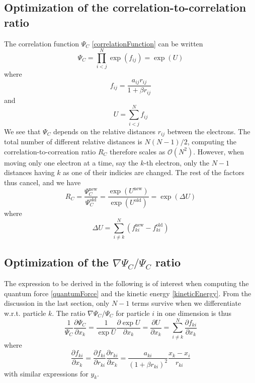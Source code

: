\documentclass[english, a4paper]{article}
\begin{document}
\subsection{Optimization of the correlation-to-correlation ratio} \label{sec:correlationRatio}
The correlation function $\Psi_C$ \eqref{correlationFunction} can be written
\begin{equation}
 \Psi_C = \prod_{i<j}^N\exp{(f_{ij})} = \exp(U)
\end{equation}
where 
\begin{equation}
 f_{ij} = \frac{a_{ij}r_{ij}}{1+\beta r_{ij}}
 \label{pade-jastrow}
\end{equation}
and 
\begin{equation}
 U = \sum_{i<j}^Nf_{ij}
\end{equation}
We see that $\Psi_C$ depends on the relative distances $r_{ij}$ between the electrons. The total
number of different relative distances is $N(N-1)/2$, computing the correlation-to-correation ratio
$R_C$ therefore scales as $\mathcal{O}(N^2)$. However, when moving only one electron at a time, say the 
$k$-th electron, only the $N-1$ distances having $k$ as one of their indicies are changed. The 
rest of the factors thus cancel, and we have
\begin{equation}
 R_C = \frac{\Psi_C^{\textrm{new}}}{\Psi_C^{\textrm{old}}} = 
 \frac{\exp{(U^{\textrm{new}})}}{\exp{(U^{\textrm{old}})}} = 
 \exp{(\Delta U)}
\end{equation}
where 
\begin{equation}
 \Delta U = \sum_{i\neq k}^N (f_{ki}^{\textrm{new}} - f_{ki}^{\textrm{old}})
\end{equation}

\subsection{Optimization of the $\nabla \Psi_C / \Psi_C$ ratio} \label{sec:correlationGradient}
The expression to be derived in the following is of interest when computing the quantum force \eqref{quantumForce}
and the kinetic energy \eqref{kineticEnergy}. From the discussion in the last section, only $N-1$ terms survive
when we differentiate w.r.t. particle $k$. 
The ratio $\nabla \Psi_C / \Psi_C$ for particle $i$
in one dimension is thus
\begin{equation}
\frac{1}{\Psi_C}\frac{\partial \Psi_C}{\partial x_k} = 
\frac{1}{\exp{U}}\frac{\partial \exp{U}}{\partial x_k} = 
\frac{\partial U}{\partial x_k} = 
\sum_{i\neq k}^N \frac{\partial f_{ki}}{\partial x_k}
\end{equation}
where
\begin{equation}
 \frac{\partial f_{ki}}{\partial x_k} = \frac{\partial f_{ki}}{\partial r_{ki}}
 \frac{\partial r_{ki}}{\partial x_k} = \frac{a_{ki}}{(1 + \beta r_{ki})^2}\frac{x_k - x_i}{r_{ki}}
\end{equation}
with similar expressions for $y_k$. 
\end{document}
